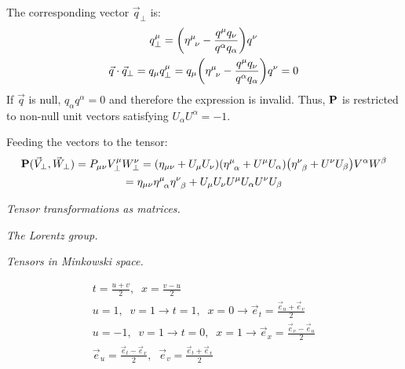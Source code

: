 \documentclass{report}
\begin{document}
\begin{subquests}
\begin{subquests}
		\item
		The corresponding vector $\vec{q}_{\perp}$ is:
		\begin{gather*}
			q^{\mu}_{\perp} = \pqty{\eta^{\mu}_{\;\;\nu} - \frac{q^{\mu}q_{\nu}}{q^{\alpha} q_{\alpha}}} q^{\nu} \\
			\vec{q}\cdot\vec{q}_{\perp} = q_{\mu} q^{\mu}_{\perp} = q_{\mu}\pqty{\eta^{\mu}_{\;\;\nu} - \frac{q^{\mu}q_{\nu}}{q^{\alpha} q_{\alpha}}} q^{\nu} = 0
		\end{gather*}
		If $\vec{q}$ is null, $q_{\alpha} q^{\alpha} = 0$ and therefore the expression is invalid. Thus, $\vb P$ is restricted to non-null unit vectors satisfying $U_{\alpha} U^{\alpha} = -1$.

		\item		
		Feeding the vectors to the tensor:
		\begin{gather*}
			{\vb P}(\vec{V}_{\perp},\vec{W}_{\perp}) = P_{\mu\nu} V^{\mu}_{\perp} W^{\nu}_{\perp} = \pqty{\eta_{\mu\nu} + U_{\mu} U_{\nu}}\pqty{\eta^{\mu}_{\;\;\alpha} + U^{\mu} U_{\alpha}}\pqty{\eta^{\nu}_{\;\;\beta} + U^{\nu} U_{\beta}} V^{\alpha} W^{\beta} \\
			= \eta_{\mu\nu} \eta^{\mu}_{\;\;\alpha} \eta^{\nu}_{\;\;\beta} + U_{\mu} U_{\nu} U^{\mu} U_{\alpha} U^{\nu} U_{\beta}
		\end{gather*}
	\end{subquests}

	\item \emph{Tensor transformations as matrices.}

	\item \emph{The Lorentz group.}

	\item \emph{Tensors in Minkowski space.}
	\begin{subquests}
		\item
		\begin{gather*}
			t = \frac{u + v}{2}, \;\; x = \frac{v - u}{2} \\
			u = 1, \;\; v = 1 \longrightarrow t = 1, \;\; x = 0 \longrightarrow \vec{e}_t = \frac{\vec{e}_u + \vec{e}_v}{2} \\
			u = -1, \;\; v = 1 \longrightarrow t = 0, \;\; x = 1 \longrightarrow \vec{e}_x = \frac{\vec{e}_v - \vec{e}_u}{2} \\
			\vec{e}_u = \frac{\vec{e}_t - \vec{e}_x}{2}, \;\; \vec{e}_v = \frac{\vec{e}_t + \vec{e}_x}{2}		
		\end{gather*}
		\begin{center}
		\end{center}


\end{subquests}
\end{subquests}
\end{document}
